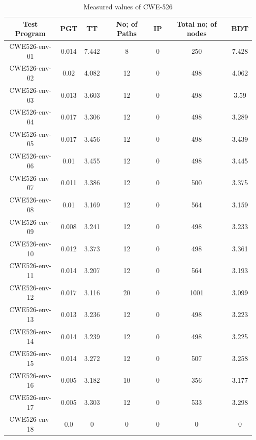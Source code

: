 \begin{table}[h!]
\centering
 \begin{tabular}{||c |c |c |c |c| c|c||} 
 \hline
 \textbf{Test Program} & \textbf{PGT} & \textbf{TT} & \textbf{No; of Paths} & \textbf{IP}& \textbf{Total no; of nodes}&
 \textbf{BDT}\\ [0.5ex] 
 \hline\hline
 CWE526-env-01 & 0.014 & 7.442 & 8 & 0& 250&7.428\\ 
 \hline
CWE526-env-02 & 0.02 & 4.082 & 12&0& 498&4.062\\ 
 \hline
 CWE526-env-03 & 0.013 & 3.603 & 12&0& 498&3.59\\ 
 \hline
 CWE526-env-04 & 0.017 & 3.306 & 12&0& 498&3.289\\ 
 \hline
 CWE526-env-05 & 0.017 & 3.456 & 12&0& 498&3.439\\ 
 \hline
 CWE526-env-06 & 0.01 & 3.455 & 12&0& 498&3.445\\ 
 \hline
 CWE526-env-07 & 0.011 & 3.386 & 12&0& 500&3.375\\ 
 \hline
 CWE526-env-08 & 0.01 & 3.169 & 12&0& 564&3.159\\ 
 \hline
 CWE526-env-09 & 0.008 & 3.241 & 12&0& 498&3.233\\ 
 \hline
 CWE526-env-10 & 0.012 & 3.373 & 12&0&498&3.361 \\ 
 \hline
 CWE526-env-11 & 0.014 & 3.207 & 12&0&564&3.193 \\ 
 \hline
 CWE526-env-12 & 0.017 & 3.116 &20&0& 1001&3.099\\ 
 \hline
 CWE526-env-13 & 0.013 & 3.236 & 12&0& 498&3.223\\ 
 \hline
 CWE526-env-14 & 0.014 & 3.239 & 12&0& 498&3.225\\ 
 \hline
 CWE526-env-15 & 0.014 & 3.272 & 12&0&507&3.258\\ 
 \hline
  CWE526-env-16 & 0.005 & 3.182 & 10&0& 356&3.177\\ 
 \hline
  CWE526-env-17 & 0.005 & 3.303 & 12&0& 533&3.298\\ 
 \hline
  CWE526-env-18 & 0.0 & 0 & 0&0& 0&0\\ 
 \hline
 \hline
\end{tabular}
\caption{Measured values of CWE-526}
\label{table:times}
\end{table}


